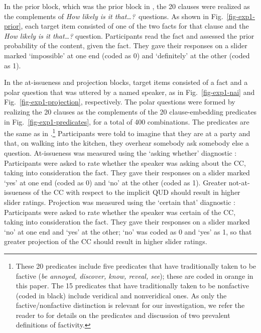 \documentclass[11pt,fleqn]{article}
\newcommand{\6}{\mbox{$[\hspace*{-.6mm}[$}}
\newcommand{\9}{\mbox{$]\hspace*{-.6mm}]$}}
\begin{document}
In the prior block, which was the prior block in \cite{degen-tonhauser-openmind}, the 20 clauses were realized as the complements of {\em How likely is it that\ldots?}~questions. As shown in Fig.~\ref{fig-exp1-prior}, each target item consisted of one of the two facts for that clause and the {\em How likely is it that\ldots?} question. Participants read the fact and assessed the prior probability of the content, given the fact. They gave their responses on a slider marked `impossible' at one end (coded as 0) and `definitely' at the other (coded as 1). 

In the at-issueness and projection blocks, target items consisted of a fact and a polar question that was uttered by a named speaker, as in Fig.~\ref{fig-exp1-nai} and Fig.~\ref{fig-exp1-projection}, respectively. The polar questions were formed by realizing the 20 clauses as the complements of the 20 clause-embedding predicates in Fig.~\ref{fig-exp1-predicates}, for a total of 400 combinations. The predicates are the same as in \cite{degen-tonhauser-openmind,degen-tonhauser-language}.\footnote{These 20 predicates include five predicates that have traditionally taken to be factive (\emph{be annoyed, discover, know, reveal, see}); these are coded in orange in this paper. The 15 predicates that have traditionally taken to be nonfactive (coded in black) include veridical and nonveridical ones. As only the factive/nonfactive distinction is relevant for our investigation, we refer the reader to \cite{degen-tonhauser-language} for details on the predicates and discussion of two prevalent definitions of factivity.}  Participants were told to imagine that they are at a party and that, on walking into the kitchen, they overhear somebody ask somebody else a question. At-issueness was measured using the `asking whether' diagnostic  \citep[as in][]{tbd-variability}: Participants were asked to rate whether the speaker was asking about the CC, taking into consideration the fact. They gave their responses on a slider marked `yes' at one end (coded as 0) and `no' at the other (coded as 1). Greater not-at-issueness of the CC with respect to the implicit QUD should result in higher slider ratings. Projection was measured using the `certain that' diagnostic \citep[as in, e.g.,][]{tbd-variability, mahler2020,degen-tonhauser-language}: Participants were asked to rate whether the speaker was certain of the CC, taking into consideration the fact. They gave their responses on a slider marked `no' at one end and `yes' at the other; `no' was coded as 0 and `yes' as 1, so that greater projection of the CC should result in higher slider ratings. 
\end{document}
